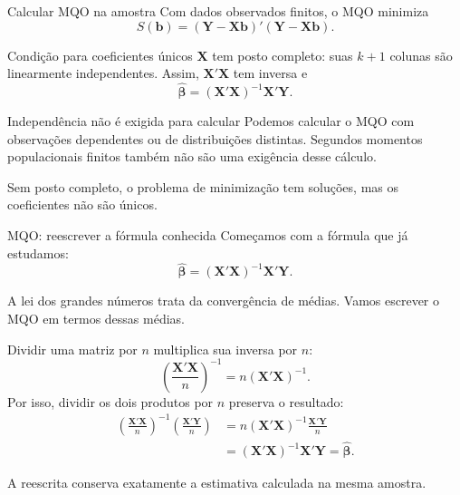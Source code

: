 \documentclass[
  ignorenonframetext,
  brazilian,
  aspectratio=169,
  10pt]{beamer}
\begin{document}
\begin{frame}{Calcular MQO na amostra}
\protect{}\label{calcular-mqo-na-amostra}
Com dados observados finitos, o MQO minimiza \[
S(\mathbf b)=(\mathbf Y-\mathbf X\mathbf b)'(\mathbf Y-\mathbf X\mathbf b).
\]

\begin{block}{Condição para coeficientes únicos}
$\mathbf X$ tem posto completo: suas $k+1$ colunas são linearmente independentes.
Assim, $\mathbf X'\mathbf X$ tem inversa e
\[
\widehat{\boldsymbol\beta}=(\mathbf X'\mathbf X)^{-1}\mathbf X'\mathbf Y.
\]
\end{block}

\begin{block}{Independência não é exigida para calcular}
Podemos calcular o MQO com observações dependentes ou de distribuições distintas.
Segundos momentos populacionais finitos também não são uma exigência desse cálculo.
\end{block}

\small

Sem posto completo, o problema de minimização tem soluções, mas os
coeficientes não são únicos.
\end{frame}

\begin{frame}{MQO: reescrever a fórmula conhecida}
\protect{}\label{mqo-reescrever-a-fuxf3rmula-conhecida}
Começamos com a fórmula que já estudamos: \[
\widehat{\boldsymbol\beta}=(\mathbf X'\mathbf X)^{-1}\mathbf X'\mathbf Y.
\]

A lei dos grandes números trata da convergência de médias. Vamos
escrever o MQO em termos dessas médias.

Dividir uma matriz por \(n\) multiplica sua inversa por \(n\): \[
\left(\frac{\mathbf X'\mathbf X}{n}\right)^{-1}
=n(\mathbf X'\mathbf X)^{-1}.
\] Por isso, dividir os dois produtos por \(n\) preserva o resultado: \[
\begin{aligned}
\left(\frac{\mathbf X'\mathbf X}{n}\right)^{-1}
\left(\frac{\mathbf X'\mathbf Y}{n}\right)
&=n(\mathbf X'\mathbf X)^{-1}\frac{\mathbf X'\mathbf Y}{n}\\
&=(\mathbf X'\mathbf X)^{-1}\mathbf X'\mathbf Y
=\widehat{\boldsymbol\beta}.
\end{aligned}
\]

\small

A reescrita conserva exatamente a estimativa calculada na mesma amostra.
\end{frame}
\end{document}
